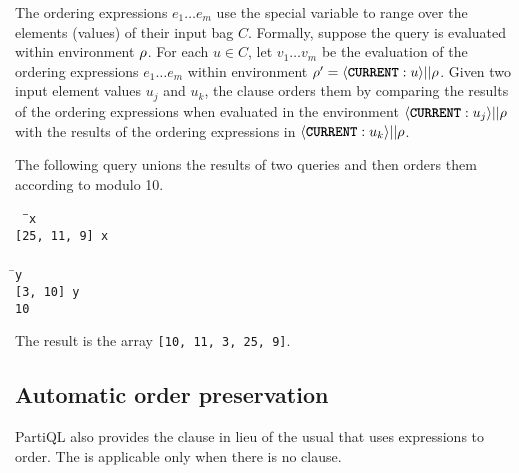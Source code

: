 {The ordering expressions $e_1 \ldots e_m$ use the special  variable
to range over the elements (values) of their input bag $C$. Formally, suppose
the query is evaluated within environment $\rho$. For each $u \in C$, let $v_1
\ldots v_m$ be the evaluation of the ordering expressions $e_1 \ldots e_m$
within environment $\rho' = \langle \texttt{\textbf{CURRENT}} : u \rangle || \rho$. Given two
input element values $u_j$ and $u_k$, the  clause orders them by
comparing the results of the ordering expressions when evaluated in the
environment $\langle \texttt{\textbf{CURRENT}} : u_j \rangle || \rho$ with the results of the
ordering expressions in $\langle \texttt{\textbf{CURRENT}} : u_k \rangle || \rho$.

\begin{example}
The following query unions the results of two queries and then orders them
according to modulo 10.

\begin{tabbing}
\ \ \=\gl{(}\=\texttt{x}\\
\>\>\texttt{[25, 11, 9] x }\gl{)} \\
\>\\
\>\>\gl{(}\=\texttt{y}\\
\>\>\texttt{[3, 10] y }\gl{)} \\
\>\texttt{10}\gl{)}\\ 
\end{tabbing}

\noindent The result is the array \texttt{[10, 11, 3, 25, 9]}.
\end{example}


\subsection{Automatic order preservation}
\label{sec:order-preservation}
PartiQL also provides the  clause in lieu of the usual
 that uses expressions to order. The  is
applicable only when there is no  clause.

}
